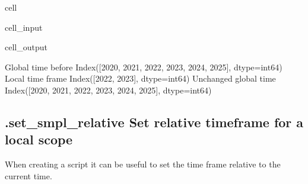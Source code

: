 \documentclass[letterpaper,10pt,english]{jupyterBook}
\begin{document}
\begin{sphinxuseclass}{cell}\begin{sphinxVerbatimInput}

\begin{sphinxuseclass}{cell_input}
\begin{sphinxVerbatim}[commandchars=\\\{\}]
 
\end{sphinxVerbatim}

\end{sphinxuseclass}\end{sphinxVerbatimInput}
\begin{sphinxVerbatimOutput}

\begin{sphinxuseclass}{cell_output}
\begin{sphinxVerbatim}[commandchars=\\\{\}]
Global time  before   Index([2020, 2021, 2022, 2023, 2024, 2025], dtype=\PYGZsq{}int64\PYGZsq{})
Local time frame      Index([2022, 2023], dtype=\PYGZsq{}int64\PYGZsq{})
Unchanged global time Index([2020, 2021, 2022, 2023, 2024, 2025], dtype=\PYGZsq{}int64\PYGZsq{})
\end{sphinxVerbatim}

\end{sphinxuseclass}\end{sphinxVerbatimOutput}

\end{sphinxuseclass}

\subsection{.set\_smpl\_relative Set relative timeframe for a local scope}
\label{\detokenize{content/notebooks/modelflow_features:set-smpl-relative-set-relative-timeframe-for-a-local-scope}}
\sphinxAtStartPar
When creating a script it can be useful to set the time frame relative to the
current time.
\end{document}
